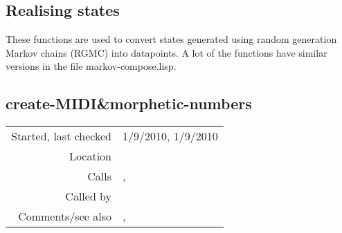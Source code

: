 \subsection{Realising states}\label{sec:realising-states}

These functions are used to convert states generated
using random generation Markov chains (RGMC) into
datapoints. A lot of the functions have similar
versions in the file markov-compose.lisp.


\subsection*{create-MIDI\&morphetic-numbers}\label{fun:create-MIDI-and-morphetic-numbers}

\vspace{0.3cm}
\begin{tabular}{r|p{8cm}}
Started, last checked & 1/9/2010, 1/9/2010 \\
Location & \nameref{sec:realising-states} \\
Calls & \nameref{fun:add-to-list}, \nameref{fun:nth-list-of-lists} \\
Called by & \nameref{fun:states2datapoints-by-lookup} \\
Comments/see also & \nameref{fun:create-MIDI-note-numbers}, \newline \nameref{fun:create-MIDI-and-morphetic-numbers<-}
\end{tabular}

